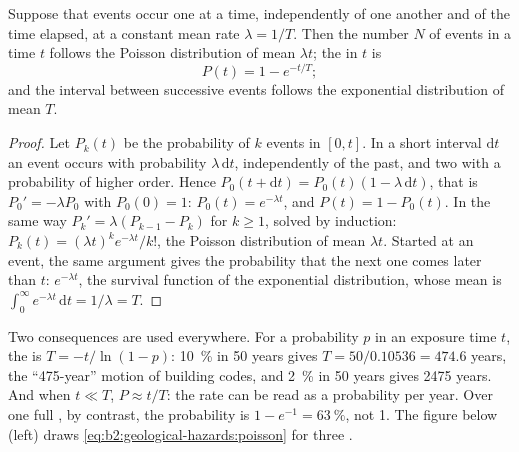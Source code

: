 \begin{proposition}\label{prop:b2:geological-hazards:poisson}
Suppose that events occur one at a time, independently of one
another and of the time elapsed, at a constant mean rate $\lambda = 1/T$. Then the number $N$ of
events in a time $t$ follows the Poisson distribution of mean $\lambda t$; the  in $t$ is
\begin{equation}
P(t) = 1 - e^{-t/T};
\label{eq:b2:geological-hazards:poisson}
\end{equation}
and the interval between successive events follows the exponential distribution of mean $T$.
\end{proposition}

\begin{proof}
Let $P_k(t)$ be the probability of $k$ events in $[0, t]$. In a short interval $\mathrm{d}t$ an
event occurs with probability $\lambda\,\mathrm{d}t$, independently of the past, and two with a
probability of higher order. Hence $P_0(t + \mathrm{d}t) = P_0(t)(1 - \lambda\,\mathrm{d}t)$, that is
$P_0' = -\lambda P_0$ with $P_0(0) = 1$: $P_0(t) = e^{-\lambda t}$, and $P(t) = 1 - P_0(t)$. In the
same way $P_k' = \lambda(P_{k-1} - P_k)$ for $k \geq 1$, solved by induction:
$P_k(t) = (\lambda t)^k e^{-\lambda t}/k!$, the Poisson distribution of mean $\lambda t$. Started at
an event, the same argument gives the probability that the next one comes later than $t$:
$e^{-\lambda t}$, the survival function of the exponential distribution, whose mean is
$\int_0^\infty e^{-\lambda t}\,\mathrm{d}t = 1/\lambda = T$.
\end{proof}

Two consequences are used everywhere. For a probability $p$ in an exposure time $t$, the  is $T = -t/\ln(1 - p)$: \qty{10}{\percent} in 50 years gives $T = 50/0.10536 =
474.6$ years, the ``475-year'' motion of building codes, and \qty{2}{\percent} in 50 years
gives 2475 years. And when $t \ll T$, $P \approx t/T$: the rate can be read as a
probability per year. Over one full , by contrast, the probability is $1 - e^{-1} =
\qty{63}{\percent}$, not 1. The figure below (left) draws \eqref{eq:b2:geological-hazards:poisson}
for three .

